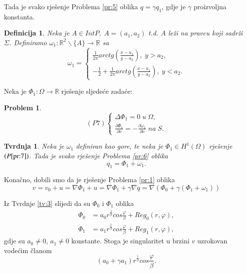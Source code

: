 \documentclass[a4paper,oneside,12pt]{memoir} %
\newtheorem{definicija}[teorem]{Definicija}
\newtheorem{problem}{Problem}
\newtheorem{tvrdnja}[teorem]{Tvrdnja}
\begin{document}
Tada je svako rješenje Problema \ref{pr:5} oblika $q = \gamma q_1$, gdje je $\gamma$ proizvoljna konstanta.

\begin{definicija}
Neka je $A \in IntP, \; A = (a_1, a_2)$ t.d. $A$ leži na pravcu koji sadrži $\Sigma$. Definiramo $\omega_1 : \mathbb{R}^2 \backslash \{A\} \rightarrow \mathbb{R}$ sa
\[
\omega_1 = \left\{
				\begin{array}{ll}
					\frac{1}{2 \pi} arctg(\frac{x-a_1}{y-a_2}), \; y > a_2, \\
					-\frac{1}{2} + \frac{1}{2 \pi} arctg(\frac{x-a_1}{y-a_2}), \; y < a_2.
				\end{array}
				\right.
\]
\end{definicija}

Neka je $\Phi_1 : \Omega \rightarrow \mathbb{R}$ rješenje sljedeće zadaće:
\begin{problem} \label{pr:7}
  \[
    (P7) \left\{
                \begin{array}{ll}
                  \Delta \Phi_1 = 0 \; u \; \Omega, \\
                  \frac{\partial \Phi_1}{\partial \nu} = -\frac{\partial \omega_1}{\partial \nu} \; na \; S.
                \end{array}
              \right.
  \]
\end{problem}

\begin{tvrdnja}
Neka je $\omega_1$ definiran kao gore, te neka je $\Phi_1 \in H^1(\Omega)$ rješenje $(P\ref{pr:7})$. Tada je svako rješenje Problema \ref{pr:6} oblika
\begin{equation*}
q_1 = \Phi_1 + \omega_1.
\end{equation*}
\end{tvrdnja}

Konačno, dobili smo da je rješenje Problema \ref{pr:1} oblika
\begin{equation*}
v = v_0 + u = \nabla \Phi_1 + u = \nabla \Phi_1 + \gamma \nabla q = \nabla (\Phi_0 + \gamma(\Phi_1 + \omega_1))
\end{equation*}

Iz Tvrdnje \ref{tv:3} slijedi da su $\Phi_0$ i $\Phi_1$ oblika
\begin{align*}
\Phi_0 &= a_0 r^{\frac{1}{\beta}} cos \frac{\varphi}{\beta} + Reg_0(r, \varphi), \\
\Phi_1 &= a_1 r^{\frac{1}{\beta}} cos \frac{\varphi}{\beta} + Reg_1(r, \varphi),
\end{align*}
gdje su $a_0 \neq 0$, $a_1 \neq 0$ konstante. \newline
Stoga je singularitet u brzini $v$ uzrokovan vodećim članom
\begin{equation} \label{eq:6}
(a_0 + \gamma a_1) r^{\frac{1}{\beta}} cos \frac{\varphi}{\beta}.
\end{equation}
\end{document}
